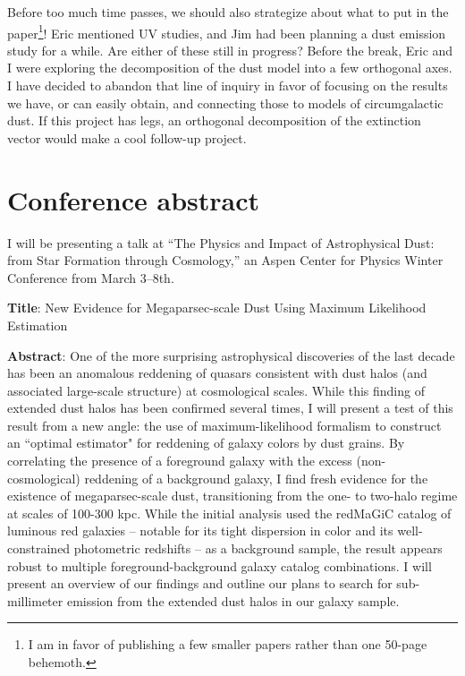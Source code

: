 \documentclass[11pt, oneside]{article}   	%
\begin{document}
Before too much time passes, we should also strategize about what to put in the paper\footnote{I am in favor of publishing a few smaller papers rather than one 50-page behemoth.}! Eric mentioned UV studies, and Jim had been planning a dust emission study for a while. Are either of these still in progress? Before the break, Eric and I were exploring the decomposition of the dust model into a few orthogonal axes. I have decided to abandon that line of inquiry in favor of focusing on the results we have, or can easily obtain, and connecting those to models of circumgalactic dust. If this project has legs, an orthogonal decomposition of the extinction vector would make a cool follow-up project. 



\section{Conference abstract}\label{sec:abstract}

I will be presenting a talk at ``The Physics and Impact of Astrophysical Dust: from Star Formation through Cosmology,'' an Aspen Center for Physics Winter Conference from March 3--8th. 

\textbf{Title}: 
New Evidence for Megaparsec-scale Dust Using Maximum Likelihood Estimation

\textbf{Abstract}: 
One of the more surprising astrophysical discoveries of the last decade has been an anomalous reddening of quasars consistent with dust halos (and associated large-scale structure) at cosmological scales. While this finding of extended dust halos has been confirmed several times, I will present a test of this result from a new angle: the use of maximum-likelihood formalism to construct an ``optimal estimator" for reddening of galaxy colors by dust grains. By correlating the presence of a foreground galaxy with the excess (non-cosmological) reddening of a background galaxy, I find fresh evidence for the existence of megaparsec-scale dust, transitioning from the one- to two-halo regime at scales of 100-300 kpc. While the initial analysis used the redMaGiC catalog of luminous red galaxies -- notable for its tight dispersion in color and its well-constrained photometric redshifts -- as a background sample, the result appears robust to multiple foreground-background galaxy catalog combinations. I will present an overview of our findings and outline our plans to search for sub-millimeter emission from the extended dust halos in our galaxy sample. 
\end{document}
